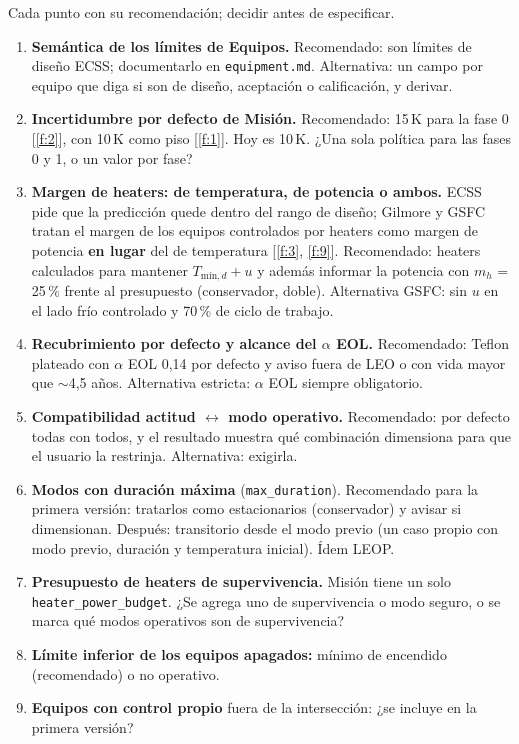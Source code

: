 \documentclass[11pt,a4paper]{article}
\newcommand{\code}[1]{\texttt{#1}}
\newcommand{\f}[1]{\ref{f:#1}}
\begin{document}
Cada punto con su recomendación; decidir antes de especificar.

\begin{enumerate}
  \item \textbf{Semántica de los límites de Equipos.} Recomendado: son límites de diseño ECSS; documentarlo en \code{equipment.md}. Alternativa: un campo por equipo que diga si son de diseño, aceptación o calificación, y derivar.
  \item \textbf{Incertidumbre por defecto de Misión.} Recomendado: 15\,K para la fase 0 [\f{2}], con 10\,K como piso [\f{1}]. Hoy es 10\,K. ¿Una sola política para las fases 0 y 1, o un valor por fase?
  \item \textbf{Margen de heaters: de temperatura, de potencia o ambos.} ECSS pide que la predicción quede dentro del rango de diseño; Gilmore y GSFC tratan el margen de los equipos controlados por heaters como margen de potencia \textbf{en lugar} del de temperatura [\f{3}, \f{9}]. Recomendado: heaters calculados para mantener $T_{\text{mín},d} + u$ y además informar la potencia con $m_h$ = 25\,\% frente al presupuesto (conservador, doble). Alternativa GSFC: sin $u$ en el lado frío controlado y 70\,\% de ciclo de trabajo.
  \item \textbf{Recubrimiento por defecto y alcance del $\alpha$ EOL.} Recomendado: Teflon plateado con $\alpha$ EOL 0,14 por defecto y aviso fuera de LEO o con vida mayor que $\sim$4,5 años. Alternativa estricta: $\alpha$ EOL siempre obligatorio.
  \item \textbf{Compatibilidad actitud $\leftrightarrow$ modo operativo.} Recomendado: por defecto todas con todos, y el resultado muestra qué combinación dimensiona para que el usuario la restrinja. Alternativa: exigirla.
  \item \textbf{Modos con duración máxima} (\code{max\_duration}). Recomendado para la primera versión: tratarlos como estacionarios (conservador) y avisar si dimensionan. Después: transitorio desde el modo previo (un caso propio con modo previo, duración y temperatura inicial). Ídem LEOP.
  \item \textbf{Presupuesto de heaters de supervivencia.} Misión tiene un solo \code{heater\_power\_budget}. ¿Se agrega uno de supervivencia o modo seguro, o se marca qué modos operativos son de supervivencia?
  \item \textbf{Límite inferior de los equipos apagados:} mínimo de encendido (recomendado) o no operativo.
  \item \textbf{Equipos con control propio} fuera de la intersección: ¿se incluye en la primera versión?

\end{enumerate}
\end{document}
